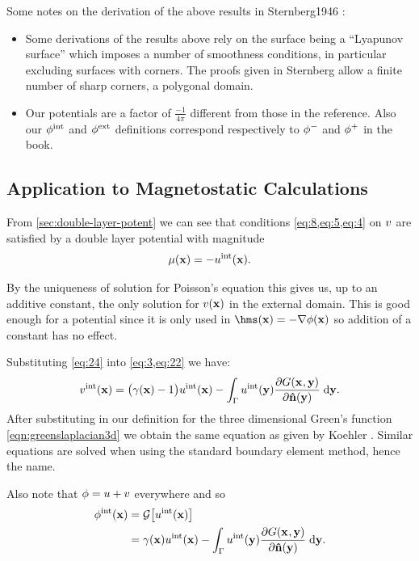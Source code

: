 Some notes on the derivation of the above results in Sternberg1946 \cite{Sternberg1946}:
\begin{itemize}
\item Some derivations of the results above rely on the surface being a ``Lyapunov surface'' which imposes a number of smoothness conditions, in particular excluding surfaces with corners.
The proofs given in Sternberg allow a finite number of sharp corners, \ie a polygonal domain.
\item Our potentials are a factor of $\frac{-1}{4 \pi}$ different from those in the reference.
Also our $\phi^{\mathrm{int}}$ and $\phi^{\mathrm{ext}}$ definitions correspond respectively to $\phi^-$ and $\phi^+$ in the book.
\end{itemize}

\subsection{Application to Magnetostatic Calculations}
\label{sec:appl-magn-calc}

From \cref{sec:double-layer-potent} we can see that conditions \cref{eq:8,eq:5,eq:4} on $v$ are satisfied by a double layer potential with magnitude
\begin{equation}
  \label{eq:24}
  \mu(\mathbf{x}) = - u^{\mathrm{int}}(\mathbf{x}).
\end{equation}

By the uniqueness of solution for Poisson's equation this gives us, up to an additive constant, the only solution for $v(\mathbf{x})$ in the external domain.
This is good enough for a potential since it is only used in $\hms(\xv) = - \grad \phim(\xv)$ so addition of a constant has no effect.

Substituting \cref{eq:24} into \cref{eq:3,eq:22} we have:
\begin{equation}
  \label{eq:6}
  v^{\mathrm{int}}(\mathbf{x}) =  \big(\gamma(\mathbf{x}) - 1 \big) u^{\mathrm{int}}(\mathbf{x})
  - \int_{{\Gamma}} u^{\mathrm{int}}(\mathbf{y}) \frac{\partial G(\mathbf{x}_{},\mathbf{y})}{\partial \mathbf{\hat{n}}(\mathbf{y})} {\; \mathrm{{d}}} \mathbf{y}.
\end{equation}
After substituting in our definition for the three dimensional Green's function \cref{eqn:greenslaplacian3d} we obtain the same equation as given by Koehler \cite{Koehler1997}.
Similar equations are solved when using the standard boundary element method, hence the name.

Also note that $\phi = u + v$ everywhere and so
\begin{equation}
  \begin{aligned}
    \label{eq:18}
    \phi^{\mathrm{int}}(\mathbf{x}) &= \mathcal{G} \big[ u^{\mathrm{int}}(\mathbf{x}) \big] \\
    &= \gamma(\mathbf{x}) u^{\mathrm{int}}(\mathbf{x})
    - \int_{{\Gamma}} u^{\mathrm{int}}(\mathbf{y}) \frac{\partial G(\mathbf{x}_{},\mathbf{y})}{\partial \mathbf{\hat{n}}(\mathbf{y})} {\; \mathrm{{d}}} \mathbf{y}.
  \end{aligned}
\end{equation}


